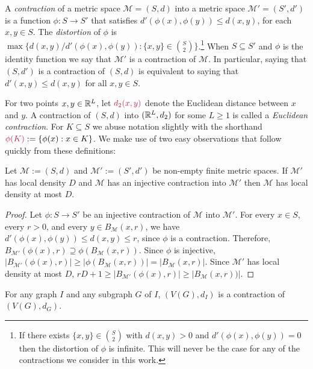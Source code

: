 \documentclass{patmorin}
\makeatletter
\renewcommand{\ge}{\geqslant}
\renewcommand{\le}{\leqslant}
\newcommand{\defin}[1]{\emph{\textcolor{brightmaroon}{#1}}}
\def\mathcolor#1#{\@mathcolor{#1}}
\def\@mathcolor#1#2#3{%
  \protect\leavevmode
  \begingroup
    \color#1{#2}#3%
  \endgroup
}
\newcommand{\mathdefin}[1]{\mathcolor{brightmaroon}{#1}}
\makeatother
\begin{document}
A \defin{contraction} of a metric space $\mathcal{M}=(S,d)$ into a metric space $\mathcal{M'}=(S',d')$ is a function $\phi:S\to S'$ that satisfies $d'(\phi(x),\phi(y))\le d(x,y)$, for each $x,y\in S$. The \defin{distortion} of $\phi$ is $\max\{d(x,y)/d'(\phi(x),\phi(y)):\{x,y\}\in \binom{S}{2}\}$.\footnote{If there exists $\{x,y\}\in \binom{S}{2}$ with $d(x,y)>0$ and $d'(\phi(x),\phi(y))=0$ then the distortion of $\phi$ is infinite. This will never be the case for any of the contractions we consider in this work.}  When $S\subseteq S'$ and $\phi$ is the identity function we say that $\mathcal{M'}$ is a contraction of $\mathcal{M}$. In particular, saying that $(S,d')$ is a contraction of $(S,d)$ is equivalent to saying that $d'(x,y)\le d(x,y)$ for all $x,y\in S$.

For two points $x,y\in\mathbb{R}^L$, let $\mathdefin{d_2(x,y)}$ denote the Euclidean distance between $x$ and $y$.  A contraction of $(S,d)$ into $(\mathbb{R}^L, d_2)$ for some $L\ge 1$ is called a \defin{Euclidean contraction}.  For $K\subseteq S$ we abuse notation slightly with the shorthand $\mathdefin{\phi(K)}:=\{\phi(x):x\in K\}$.   We make use of two easy observations that follow quickly from these definitions:

\begin{obs}\label{contraction_increases_density}
  Let $\mathcal{M}:=(S,d)$ and $\mathcal{M}':=(S',d')$ be non-empty finite metric spaces.  If $\mathcal{M'}$ has local density $D$ and $\mathcal{M}$ has an injective contraction into $\mathcal{M}'$ then  $\mathcal{M}$ has local density at most $D$.
\end{obs}

\begin{proof}

  Let $\phi:S\to S'$ be an injective contraction of $\mathcal{M}$ into $\mathcal{M}'$.  For every $x\in S$, every $r > 0$, and every $y\in B_\mathcal{M}(x,r)$, we have $d'(\phi(x),\phi(y))\le d(x,y)\le r$, since $\phi$ is a contraction.  Therefore, $B_{\mathcal{M'}}(\phi(x),r)\supseteq \phi(B_{\mathcal{M}}(x,r))$.  Since $\phi$ is injective, $|B_{\mathcal{M'}}(\phi(x),r)|\ge |\phi(B_{\mathcal{M}}(x,r))|=|B_{\mathcal{M}}(x,r)|$.
  Since $\mathcal{M}'$ has local density at most $D$, $rD+1\ge |B_{\mathcal{M'}}(\phi(x),r)|\ge  |B_{\mathcal{M}}(x,r))|$.
\end{proof}

\begin{obs}\label{supergraph_contraction}
  For any graph $I$ and any subgraph $G$ of $I$, $(V(G),d_I)$ is a contraction of $(V(G),d_G)$.
\end{obs}
\end{document}
